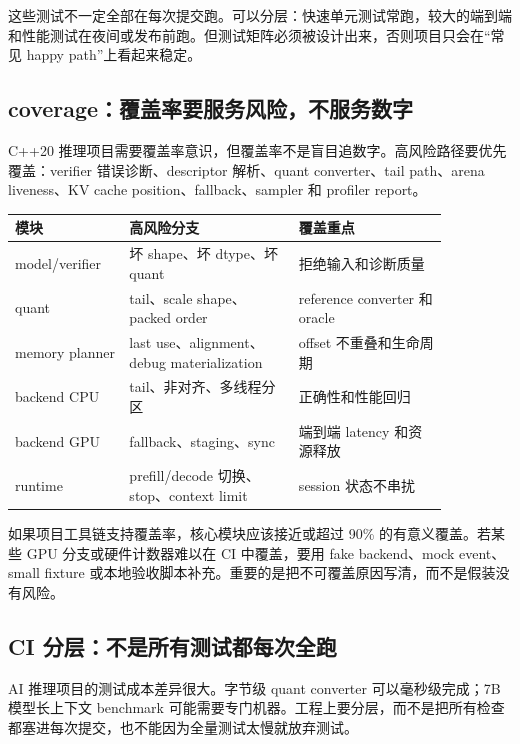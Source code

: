 这些测试不一定全部在每次提交跑。可以分层：快速单元测试常跑，较大的端到端和性能测试在夜间或发布前跑。但测试矩阵必须被设计出来，否则项目只会在“常见 happy path”上看起来稳定。

\subsection{coverage：覆盖率要服务风险，不服务数字}

C++20 推理项目需要覆盖率意识，但覆盖率不是盲目追数字。高风险路径要优先覆盖：verifier 错误诊断、descriptor 解析、quant converter、tail path、arena liveness、KV cache position、fallback、sampler 和 profiler report。

\begin{center}
\begin{tabular}{p{0.22\linewidth}p{0.34\linewidth}p{0.30\linewidth}}
\toprule
模块 & 高风险分支 & 覆盖重点 \\
\midrule
model/verifier & 坏 shape、坏 dtype、坏 quant & 拒绝输入和诊断质量 \\
quant & tail、scale shape、packed order & reference converter 和 oracle \\
memory planner & last use、alignment、debug materialization & offset 不重叠和生命周期 \\
backend CPU & tail、非对齐、多线程分区 & 正确性和性能回归 \\
backend GPU & fallback、staging、sync & 端到端 latency 和资源释放 \\
runtime & prefill/decode 切换、stop、context limit & session 状态不串扰 \\
\bottomrule
\end{tabular}
\end{center}

如果项目工具链支持覆盖率，核心模块应该接近或超过 90\% 的有意义覆盖。若某些 GPU 分支或硬件计数器难以在 CI 中覆盖，要用 fake backend、mock event、small fixture 或本地验收脚本补充。重要的是把不可覆盖原因写清，而不是假装没有风险。

\subsection{CI 分层：不是所有测试都每次全跑}

AI 推理项目的测试成本差异很大。字节级 quant converter 可以毫秒级完成；7B 模型长上下文 benchmark 可能需要专门机器。工程上要分层，而不是把所有检查都塞进每次提交，也不能因为全量测试太慢就放弃测试。

